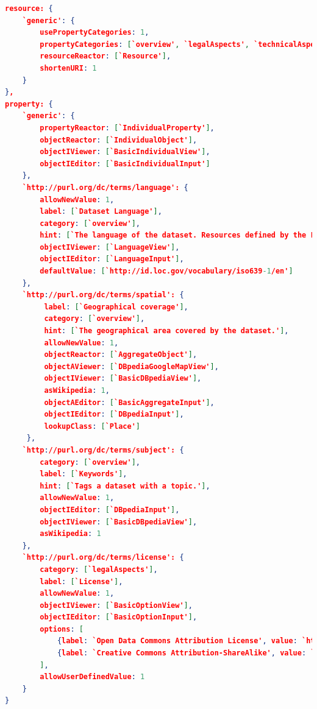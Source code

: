 \documentclass{acm_proc_article-sp}
\begin{document}
\begin{lstlisting}[language=json,firstnumber=1, label=code:config, caption=An excerpt of the LD-Reactor configuration for the RISIS metadata editor.]
resource: {
    `generic': {
        usePropertyCategories: 1,
        propertyCategories: [`overview', `legalAspects', `technicalAspects'],
        resourceReactor: [`Resource'],
        shortenURI: 1
    }
},
property: {
    `generic': {
        propertyReactor: [`IndividualProperty'],
        objectReactor: [`IndividualObject'],
        objectIViewer: [`BasicIndividualView'],
        objectIEditor: [`BasicIndividualInput']
    },
    `http://purl.org/dc/terms/language': {
        allowNewValue: 1,
        label: [`Dataset Language'],
        category: [`overview'],
        hint: [`The language of the dataset. Resources defined by the Library of Congress (http://id.loc.gov/vocabulary/iso639-1.html, http://id.loc.gov/vocabulary/iso639-2.html) SHOULD be used.'],
        objectIViewer: [`LanguageView'],
        objectIEditor: [`LanguageInput'],
        defaultValue: [`http://id.loc.gov/vocabulary/iso639-1/en']
    },
    `http://purl.org/dc/terms/spatial': {
         label: [`Geographical coverage'],
         category: [`overview'],
         hint: [`The geographical area covered by the dataset.'],
         allowNewValue: 1,
         objectReactor: [`AggregateObject'],
         objectAViewer: [`DBpediaGoogleMapView'],
         objectIViewer: [`BasicDBpediaView'],
         asWikipedia: 1,
         objectAEditor: [`BasicAggregateInput'],
         objectIEditor: [`DBpediaInput'],
         lookupClass: [`Place']
     },
    `http://purl.org/dc/terms/subject': {
        category: [`overview'],
        label: [`Keywords'],
        hint: [`Tags a dataset with a topic.'],
        allowNewValue: 1,
        objectIEditor: [`DBpediaInput'],
        objectIViewer: [`BasicDBpediaView'],
        asWikipedia: 1
    },
    `http://purl.org/dc/terms/license': {
        category: [`legalAspects'],
        label: [`License'],
        allowNewValue: 1,
        objectIViewer: [`BasicOptionView'],
        objectIEditor: [`BasicOptionInput'],
        options: [
            {label: `Open Data Commons Attribution License', value: `http://www.opendatacommons.org/licenses/by/'},
            {label: `Creative Commons Attribution-ShareAlike', value: `http://creativecommons.org/licenses/by-sa/3.0/'}
        ],
        allowUserDefinedValue: 1
    }   
}
\end{lstlisting}
\end{document}
